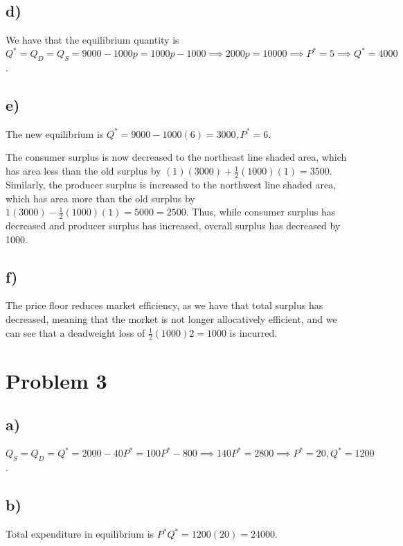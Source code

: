 \documentclass[12pt,letterpaper]{article}
\theoremstyle{definition}
\begin{document}
\subsection*{d)}

We have that the equilibrium quantity is $Q^*= Q_D= Q_S = 9000 - 1000p = 1000p -
1000 \implies 2000p = 10000 \implies P^* = 5 \implies Q^* = 4000$.

\subsection*{e)}

The new equilibrium is $Q^* = 9000 - 1000(6) = 3000, P^* = 6$.

The consumer surplus is now decreased to the northeast line shaded area, which
has area less than the old surplus by $(1)(3000) +\frac{1}{2}(1000)(1) = 3500$. Similarly, the
producer surplus is increased to the northwest line shaded area, which has area
more than the old surplus by $1(3000) - \frac{1}{2}(1000)(1) = 5000 = 2500$.
Thus, while consumer surplus has decreased and producer surplus has increased,
overall surplus has decreased by 1000.

\subsection*{f)}

The price floor reduces market efficiency, as we have that total surplus has
decreased, meaning that the morket is not longer allocatively efficient, and we
can see that a deadweight loss of $\frac{1}{2}(1000)2 = 1000$ is incurred.

\section*{Problem 3}

\subsection*{a)}

$Q_S = Q_D = Q^* =2000 - 40P^* = 100P^* - 800 \implies 140P^* = 2800 \implies
P^* = 20, Q^* = 1200$.

\subsection*{b)}

Total expenditure in equilibrium is $P^*Q^* = 1200(20) =24000$.
\end{document}
